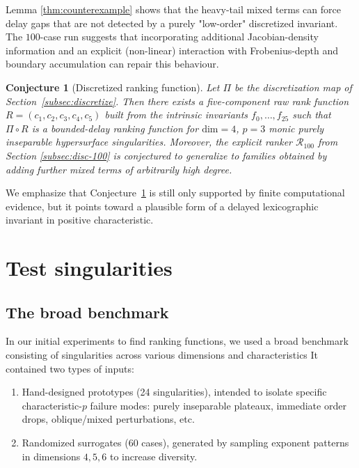 \documentclass[11pt]{amsart}
\newtheorem{conjecture}{Conjecture}
\begin{document}
Lemma \ref{thm:counterexample} shows that the heavy-tail mixed terms can force delay gaps
that are not detected by a purely "low-order" discretized invariant.
The $100$-case run suggests that incorporating additional Jacobian-density information and an explicit
(non-linear) interaction with Frobenius-depth and boundary accumulation can repair this behaviour.

\begin{conjecture}[Discretized ranking function]
\label{conj:disc-robust}
Let $\Pi$ be the discretization map of Section~\ref{subsec:discretize}. 
Then there exists a five-component raw rank function $R=(c_1,c_2,c_3,c_4,c_5)$ built from the intrinsic invariants $f_0,\ldots, f_{25}$ such that $\Pi \circ R$ is a bounded-delay ranking function for $\mathrm{dim}=4$, $p=3$ monic purely inseparable hypersurface singularities. 
Moreover, the explicit ranker $\mathcal{R}_{100}$ from Section \ref{subsec:disc-100} is conjectured to generalize to families obtained by adding further mixed terms of arbitrarily high degree.
\end{conjecture}

We emphasize that Conjecture~\ref{conj:disc-robust} is still only supported by finite computational evidence,
but it points toward a plausible form of a delayed lexicographic invariant in positive characteristic.

\appendix

\section{Test singularities}

\subsection{The broad benchmark}
In our initial experiments to find ranking functions, we used a broad benchmark consisting of singularities across various dimensions and characteristics It contained two types of inputs:
\begin{enumerate}
  \item Hand-designed prototypes (24 singularities), intended to isolate specific characteristic-$p$ failure modes: purely inseparable plateaux, immediate order drops, oblique/mixed perturbations, etc.
  \item Randomized surrogates (60 cases), generated by sampling exponent patterns in dimensions
  $4,5,6$ to increase diversity.
\end{enumerate}
\end{document}
